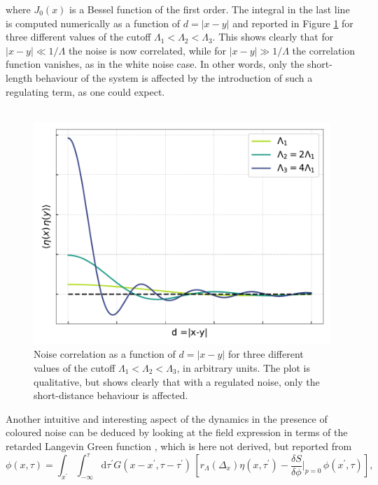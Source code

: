 where $J_0(x)$ is a Bessel function of the first order. The integral in the last line is computed numerically as a function of $d=|x-y|$ and reported in Figure \ref{fig:bessel} for three different values of the cutoff $\Lambda_1 < \Lambda_2 < \Lambda_3$. This shows clearly that for $|x-y| \ll 1/\Lambda$ the noise is now correlated, while for $|x-y| \gg 1/\Lambda$ the correlation function vanishes, as in the white noise case. In other words, only the short-length behaviour of the system is affected by the introduction of such a regulating term, as one could expect.\\~\\
\begin{figure}
    \centering
    \includegraphics[scale=0.6]{figures/bessel.pdf}
    \caption[Correlated noise]{Noise correlation as a function of $d=|x-y|$ for three different values of the cutoff $\Lambda_1 < \Lambda_2 < \Lambda_3$, in arbitrary units. The plot is qualitative, but shows clearly that with a regulated noise, only the short-distance behaviour is affected.}
    \label{fig:bessel}
\end{figure}
Another intuitive and interesting aspect of the dynamics in the presence of coloured noise can be deduced by looking at the field expression in terms of the retarded Langevin Green function \cite{Damgaard1987StochasticQuantization}, which is here not derived, but reported from \cite{Pawlowski2017CoolingNoise}
\begin{equation*}
        \phi(x, \tau) = \int_{x^{\prime}} \int_{-\infty}^\tau \mathrm{d} \tau^{\prime} G\left(x-x^{\prime}, \tau-\tau^{\prime}\right) \, \left[r_{\Lambda}\left(\Delta_x\right) \eta\left(x, \tau^{\prime}\right)-\frac{\delta S}{\delta \phi}|_{p=0} \, \phi\left(x^{\prime}, \tau\right)\right],
\end{equation*}
